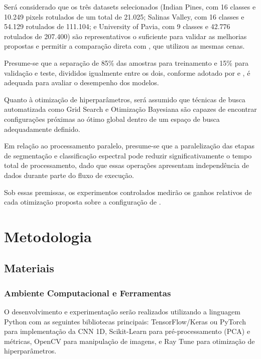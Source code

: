 Será considerado que os três datasets selecionados (Indian Pines, com 16 classes e 10.249 pixels rotulados de um total de 21.025; Salinas Valley, com 16 classes e 54.129 rotulados de 111.104; e University of Pavia, com 9 classes e 42.776 rotulados de 207.400) são representativos o suficiente para validar as melhorias propostas e permitir a comparação direta com , que utilizou as mesmas cenas.

Presume-se que a separação de 85\% das amostras para treinamento e 15\% para validação e teste, divididos igualmente entre os dois, conforme adotado por  e , é adequada para avaliar o desempenho dos modelos.

Quanto à otimização de hiperparâmetros, será assumido que técnicas de busca automatizada como Grid Search e Otimização Bayesiana são capazes de encontrar configurações próximas ao ótimo global dentro de um espaço de busca adequadamente definido.

Em relação ao processamento paralelo, presume-se que a paralelização das etapas de segmentação e classificação espectral pode reduzir significativamente o tempo total de processamento, dado que essas operações apresentam independência de dados durante parte do fluxo de execução.

Sob essas premissas, os experimentos controlados medirão os ganhos relativos de cada otimização proposta sobre a configuração de .

\section{Metodologia}

\subsection{Materiais}

\subsubsection{Ambiente Computacional e Ferramentas}

O desenvolvimento e experimentação serão realizados utilizando a linguagem Python com as seguintes bibliotecas principais: TensorFlow/Keras ou PyTorch para implementação da CNN 1D, Scikit-Learn para pré-processamento (PCA) e métricas, OpenCV para manipulação de imagens, e Ray Tune para otimização de hiperparâmetros.

